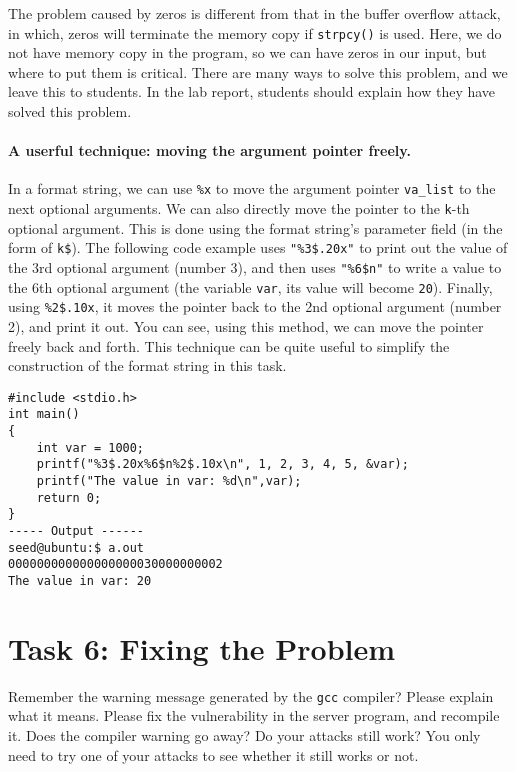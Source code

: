 The problem caused by zeros is different from that
in the buffer overflow attack, in which,
zeros will terminate the memory copy if \texttt{strpcy()} is used. 
Here, we do not have memory copy in the program, 
so we can have zeros in our input, but where to put them
is critical. 
There are many ways to solve this problem, and 
we leave this to students. In the lab report, students
should explain how they have solved this problem. 


\paragraph{A userful technique: moving the argument pointer freely.}
In a format string, we can use \texttt{\%x} to move the
argument pointer \texttt{va\_list} to the next optional arguments.
We can also directly move the pointer to the \texttt{k}-th optional argument.
This is done using the format string's parameter field (in the form of
\texttt{k\$}).
The following code example uses \texttt{"\%3\$.20x"} to print out the value of the
3rd optional argument (number 3), and then uses \texttt{"\%6\$n"} to write
a value to the 6th optional argument (the variable \texttt{var}, its
value will become \texttt{20}). Finally,
using \texttt{\%2\$.10x}, it moves the pointer back to the 2nd
optional argument (number 2), and print it out. You can see,
using this method, we can move the pointer freely back and forth.
This technique can be quite useful to simplify the construction
of the format string in this task.

\begin{lstlisting}
#include <stdio.h>
int main()
{
    int var = 1000;
    printf("%3$.20x%6$n%2$.10x\n", 1, 2, 3, 4, 5, &var);
    printf("The value in var: %d\n",var);
    return 0;
}
----- Output ------
seed@ubuntu:$ a.out
000000000000000000030000000002
The value in var: 20
\end{lstlisting}




\section{Task 6: Fixing the Problem}

Remember the warning message generated by the \texttt{gcc} compiler? Please explain what
it means. Please fix the vulnerability in the server program, and recompile it. 
Does the compiler warning go away? Do your attacks 
still work? You only need to try one of your attacks to see whether it still
works or not. 


